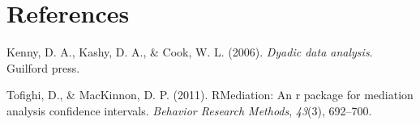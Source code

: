 \documentclass[man]{apa6}
\begin{document}
\newpage

\hypertarget{references}{%
\section{References}\label{references}}

\begingroup
\setlength{\parindent}{-0.5in}
\setlength{\leftskip}{0.5in}

\hypertarget{refs}{}
\leavevmode\hypertarget{ref-apim}{}%
Kenny, D. A., Kashy, D. A., \& Cook, W. L. (2006). \emph{Dyadic data analysis}. Guilford press.

\leavevmode\hypertarget{ref-monte}{}%
Tofighi, D., \& MacKinnon, D. P. (2011). RMediation: An r package for mediation analysis confidence intervals. \emph{Behavior Research Methods}, \emph{43}(3), 692--700.

\endgroup
\end{document}
